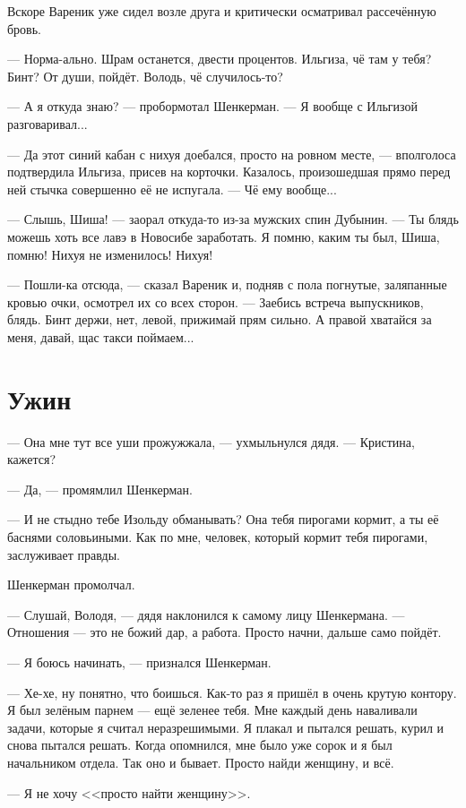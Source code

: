 \documentclass[a4paper,10pt,fleqn]{book}\usepackage{polyglossia}\setdefaultlanguage{english}\setotherlanguage{russian}\defaultfontfeatures{Ligatures=TeX,Mapping=tex-text} \usepackage{xcolor}\definecolor{lightgray}{HTML}{bbbbbb}\color{lightgray}\newcommand{\ml}[3]{\textcolor{black}{#3}}
\begin{document}
Вскоре Вареник уже сидел возле друга и критически осматривал рассечённую бровь.

--- Норма-ально.
Шрам останется, двести процентов.
Ильгиза, чё там у тебя?
Бинт?
От души, пойдёт.
Володь, чё случилось-то?

--- А я откуда знаю? --- пробормотал Шенкерман.
--- Я вообще с Ильгизой разговаривал...

--- Да этот синий кабан с нихуя доебался, просто на ровном месте, --- вполголоса подтвердила Ильгиза, присев на корточки.
Казалось, произошедшая прямо перед ней стычка совершенно её не испугала.
--- Чё ему вообще...

--- Слышь, Шиша! --- заорал откуда-то из-за мужских спин Дубынин.
--- Ты блядь можешь хоть все лавэ в Новосибе заработать.
Я помню, каким ты был, Шиша, помню!
Нихуя не изменилось!
Нихуя!

--- Пошли-ка отсюда, --- сказал Вареник и, подняв с пола погнутые, заляпанные кровью очки, осмотрел их со всех сторон.
--- Заебись встреча выпускников, блядь.
Бинт держи, нет, левой, прижимай прям сильно.
А правой хватайся за меня, давай, щас такси поймаем...

\section{Ужин}


--- Она мне тут все уши прожужжала, --- ухмыльнулся дядя.
--- Кристина, кажется?

--- Да, --- промямлил Шенкерман.

--- И не стыдно тебе Изольду обманывать?
Она тебя пирогами кормит, а ты её баснями соловьиными.
Как по мне, человек, который кормит тебя пирогами, заслуживает правды.

Шенкерман промолчал.

--- Слушай, Володя, --- дядя наклонился к самому лицу Шенкермана.
--- Отношения --- это не божий дар, а работа.
Просто начни, дальше само пойдёт.

--- Я боюсь начинать, --- признался Шенкерман.

--- Хе-хе, ну понятно, что боишься.
Как-то раз я пришёл в очень крутую контору.
Я был зелёным парнем --- ещё зеленее тебя.
Мне каждый день наваливали задачи, которые я считал неразрешимыми.
Я плакал и пытался решать, курил и снова пытался решать.
Когда опомнился, мне было уже сорок и я был начальником отдела.
Так оно и бывает.
Просто найди женщину, и всё.

--- Я не хочу <<просто найти женщину>>.
\end{document}
